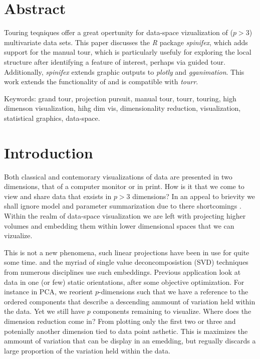 \documentclass{monashthesis}
\begin{document}
\section{Abstract}\label{abstract-1}

Touring teqniques offer a great opertunity for data-space vizualization
of (\(p > 3\)) multivariate data sets. This paper discusses the \emph{R}
package \emph{spinifex}, which adds support for the manual tour, which
is particularly usefuly for exploring the local structure after
identifying a feature of interest, perhaps via guided tour.
Additionally, \emph{spinifex} extends graphic outputs to \emph{plotly}
and \emph{gganimation}. This work extends the functionality of and is
compatible with \emph{tourr}.

Keywords: grand tour, projection pursuit, manual tour, tourr, touring,
high dimenson visualization, hihg dim vis, dimensionality reduction,
visualization, statistical graphics, data-space.

\section{Introduction}\label{introduction}

Both classical and contemorary visualizations of data are presented in
two dimensions, that of a computer monitor or in print. How is it that
we come to view and share data that exsists in \(p > 3\) dimensions? In
an appeal to brievity we shall ignore model and parameter summarization
due to there shortcomings
\autocites{anscombe_graphs_1973}{matejka_same_2017}. Within the realm of
data-space visualization we are left with projecting higher volumes and
embedding them within lower dimensional spaces that we can vizualize.

This is not a new phenomena, such linear projections have been in use
for quite some time. \autocites{PCA}{LDA-FISCHer1936} and the myriad of
single value deconcomposistion (SVD) techniques from numerous
disciplines use such embeddings. Previous application look at data in
one (or few) static orientations, after some objective optimization. For
instance in PCA, we reorient \(p\)-dimensions such that we have a
reference to the ordered components that describe a descending ammount
of variation held within the data. Yet we still have \(p\) components
remaining to visualize. Where does the dimension reduction come in? From
plotting only the first two or three and potenially another dimension
tied to data point asthetic. This is maximizes the ammount of variation
that can be display in an emedding, but regually discards a large
proportion of the variation held within the data.
\end{document}
